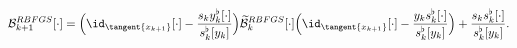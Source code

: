 \begin{equation}\label{RiemannianInverseBFGSFormula}
        \mathcal{B}^{RBFGS}_{k+1} [\cdot] = \Big{(} \id_{\tangent{x_{k+1}}}[\cdot] - \frac{s_k y^{\flat}_k [\cdot]}{s^{\flat}_k [y_k]} \Big{)} \widetilde{\mathcal{B}}^{RBFGS}_k [\cdot] \Big{(} \id_{\tangent{x_{k+1}}}[\cdot] - \frac{y_k s^{\flat}_k [\cdot]}{s^{\flat}_k [y_k]} \Big{)} + \frac{s_k s^{\flat}_k [\cdot]}{s^{\flat}_k [y_k]}.
\end{equation}